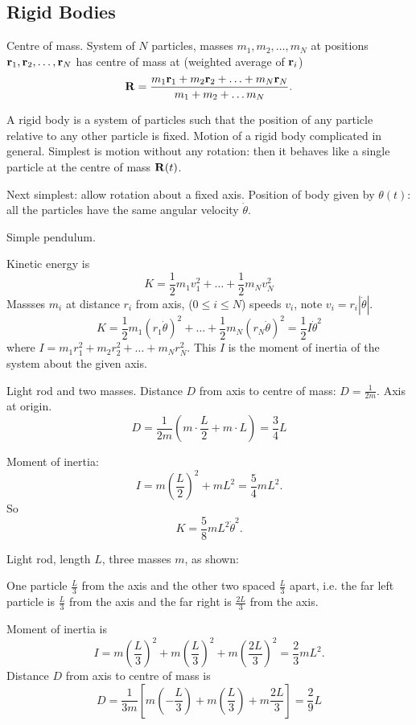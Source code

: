 \documentclass[10pt, a4paper]{article}
\begin{document}
\subsection{Rigid Bodies}

Centre of mass.
System of $N$ particles,
masses $m_1, m_2, \dotsc, m_N$ at positions $\mathbf{r}_1, \mathbf{r}_2, \dotsc, \mathbf{r}_N$ has centre of mass at
(weighted average of $\mathbf{r}_i$)
\[
\mathbf{R} = \frac{m_1\mathbf{r}_1 + m_2\mathbf{r}_2 + \dotsc + m_N\mathbf{r}_N}{m_1 + m_2 + \dotsc m_N}.
\]

A rigid body is a system of particles such that the position of any particle relative to any other particle is fixed.
Motion of a rigid body complicated in general.
Simplest is motion without any rotation:
then it behaves like a single particle at the centre of mass $\mathbf{R}(t)$.

Next simplest:
allow rotation about a fixed axis.
Position of body given by $\theta(t)$:
all the particles have the same angular velocity $\dot{\theta}$.

\begin{example}
    Simple pendulum.

    Kinetic energy is
    \[
    K = \frac{1}{2}m_1v_1 ^ 2 + \dotsc + \frac{1}{2}m_Nv_N ^ 2
    \]
    Massses $m_i$ at distance $r_i$ from axis,
    ($0 \leq i \leq N$)
    speeds $v_i$,
    note $v_i = r_i|\dot{\theta}|$.
    \[
    K = \frac{1}{2}m_1(r_1\dot{\theta}) ^ 2 + \dotsc + \frac{1}{2}m_N(r_N\dot{\theta}) ^ 2 = \frac{1}{2}I\dot{\theta} ^ 2
    \]
    where $I = m_1r_1 ^ 2 + m_2r_2 ^ 2 + \dotsc + m_Nr_N ^ 2$.
    This $I$ is the moment of inertia of the system about the given axis.
\end{example}

\begin{example}[$0a$]
    Light rod and two masses.
    Distance $D$ from axis to centre of mass:
    $D = \frac{1}{2m}$.
    Axis at origin.
    \[
    D = \frac{1}{2m}\left(m\cdot\frac{L}{2} + m\cdot L\right) = \frac{3}{4}L
    \]
    
    Moment of inertia:
    \[
    I = m\left(\frac{L}{2}\right) ^ 2 + mL ^ 2 = \frac{5}{4}mL ^ 2.
    \]
    So
    \[
    K = \frac{5}{8}mL ^ 2\dot{\theta} ^ 2.
    \]
\end{example}

\begin{example}
    Light rod,
    length $L$,
    three masses $m$,
    as shown:

    One particle $\frac{L}{3}$ from the axis and the other two spaced $\frac{L}{3}$ apart,
    i.e. the far left particle is $\frac{L}{3}$ from the axis and the far right is $\frac{2L}{3}$ from the axis.

    Moment of inertia is
    \[
    I = m\left(\frac{L}{3}\right) ^ 2 + m\left(\frac{L}{3}\right) ^ 2 + m\left(\frac{2L}{3}\right) ^ 2 = \frac{2}{3}mL ^ 2.
    \]
    Distance $D$ from axis to centre of mass is
    \[
    D = \frac{1}{3m}\left[m\left(-\frac{L}{3}\right) + m\left(\frac{L}{3}\right) + m\frac{2L}{3}\right] = \frac{2}{9}L
    \]
\end{example}
\end{document}
